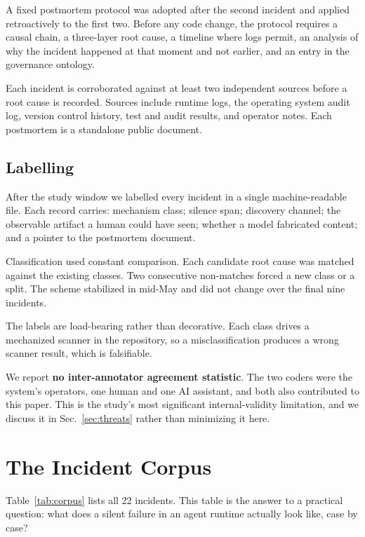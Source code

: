 \documentclass[conference]{IEEEtran}
\begin{document}
A fixed postmortem protocol was adopted after the second incident and
applied retroactively to the first two. Before any code change, the protocol
requires a causal chain, a three-layer root cause, a timeline where logs
permit, an analysis of why the incident happened at that moment and not
earlier, and an entry in the governance ontology.

Each incident is corroborated against at least two independent sources
before a root cause is recorded. Sources include runtime logs, the operating
system audit log, version control history, test and audit results, and
operator notes. Each postmortem is a standalone public document.

\subsection{Labelling}
\label{sec:labelling}

After the study window we labelled every incident in a single
machine-readable file. Each record carries: mechanism class; silence span;
discovery channel; the observable artifact a human could have seen; whether
a model fabricated content; and a pointer to the postmortem document.

Classification used constant comparison. Each candidate root cause was
matched against the existing classes. Two consecutive non-matches forced a
new class or a split. The scheme stabilized in mid-May and did not change
over the final nine incidents.

The labels are load-bearing rather than decorative. Each class drives a
mechanized scanner in the repository, so a misclassification produces a
wrong scanner result, which is falsifiable.

We report \textbf{no inter-annotator agreement statistic}. The two coders
were the system's operators, one human and one AI assistant, and both also
contributed to this paper. This is the study's most significant
internal-validity limitation, and we discuss it in Sec.~\ref{sec:threats}
rather than minimizing it here.

\section{The Incident Corpus}
\label{sec:corpus}

Table~\ref{tab:corpus} lists all 22 incidents. This table is the answer to a
practical question: what does a silent failure in an agent runtime actually
look like, case by case?
\end{document}
